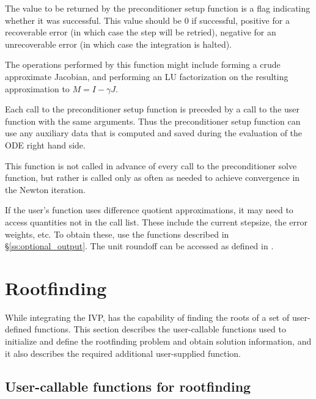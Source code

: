 {
  The value to be returned by the preconditioner setup function is a flag
  indicating whether it was successful.  This value should be $0$ if successful, 
  positive for a recoverable error (in which case the step will be retried),     
  negative for an unrecoverable error (in which case the integration is halted). 
}
{
  The operations performed by this function might include forming a crude 
  approximate Jacobian, and performing an LU factorization on the resulting
  approximation to $M=I - \gamma J$.

  Each call to the preconditioner setup function is preceded by a call to     
  the  user function with the same  arguments.  
  Thus the preconditioner setup function can use any auxiliary data that is 
  computed and saved during the evaluation of the ODE right hand side.
  
  This function is not called in advance of every call to the preconditioner
  solve function, but rather is called only as often as needed to achieve
  convergence in the Newton iteration. 

  If the user's  function uses difference quotient
  approximations, it may need to access quantities not in the call
  list. These include the current stepsize, the error weights, etc.
  To obtain these, use the  functions described in
  \S\ref{ss:optional_output}. The unit roundoff can be accessed
  as  defined in .
}

\section{Rootfinding}\label{s:using_rootfinding}

While integrating the IVP, {\cvode} has the capability of finding the
roots of a set of user-defined functions. This section describes the
user-callable functions used to initialize and define the rootfinding
problem and obtain solution information, and it also describes the
required additional user-supplied function.

\subsection{User-callable functions for rootfinding}\label{ss:root_uc}

